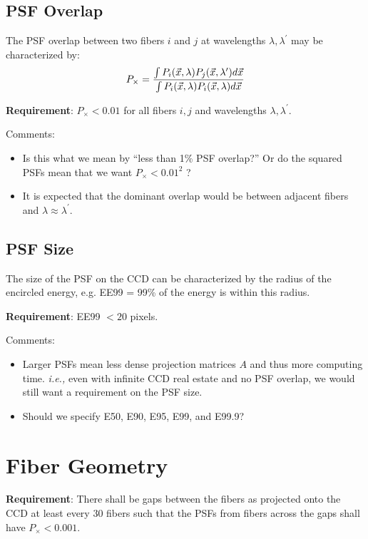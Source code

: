 \documentclass[12pt]{article}
\begin{document}
\subsection{PSF Overlap}

The PSF overlap between two fibers $i$ and $j$ at wavelengths
$\lambda, \lambda^\prime$ may be characterized by:
\begin{equation}
    P_\times =
        { \int P_i(\vec x, \lambda) P_j(\vec x, \lambda^\prime) d \vec x \over
          \int P_i(\vec x, \lambda) P_i(\vec x, \lambda) d \vec x }
\end{equation}

{\bf Requirement}: $P_\times < 0.01$ for all fibers $i, j$ and
wavelengths $\lambda, \lambda^\prime$.

Comments:
\begin{itemize}
    \item Is this what we mean by ``less than 1\% PSF overlap?''  Or do
        the squared PSFs mean that we want $P_\times < 0.01^2$ ?
    \item It is expected that the dominant overlap would be between
        adjacent fibers and $\lambda \approx \lambda^\prime$.
\end{itemize}

\subsection{PSF Size}

The size of the PSF on the CCD can be characterized by the radius of the
encircled energy, e.g. EE99 = 99\% of the energy is within this radius.

{\bf Requirement}: EE99 $< 20$ pixels.

Comments:
\begin{itemize}
    \item Larger PSFs mean less dense projection matrices $A$ and thus
        more computing time.  {\it i.e.,} even with infinite CCD real estate and no
        PSF overlap, we would still want a requirement on the PSF size.
    \item Should we specify E50, E90, E95, E99, and E99.9?
\end{itemize}

\section{Fiber Geometry}

{\bf Requirement}: There shall be gaps between the fibers as projected
onto the CCD at least every 30 fibers such that the PSFs from fibers
across the gaps shall have $P_\times < 0.001$.
\end{document}
